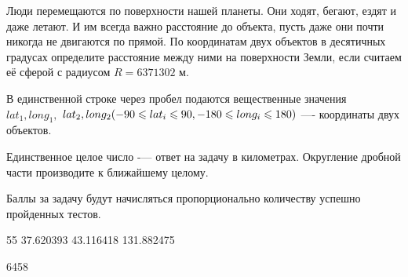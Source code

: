 
Люди перемещаются по поверхности нашей планеты. Они ходят, бегают, ездят и даже летают. И им всегда важно расстояние до объекта, пусть даже они почти никогда не двигаются по прямой. По координатам двух объектов в десятичных градусах определите расстояние между ними на поверхности Земли, если считаем её сферой с радиусом $R = 6371302$ м.


В единственной строке через пробел подаются вещественные значения $ lat_1, long_1,$ \linebreak $lat_2, long_2 \space(-90 \leq lat_i \leq 90, -180 \leq long_i \leq 180) $ —- координаты двух объектов.

\outputfmtSection

Единственное целое число -— ответ на задачу в километрах. Округление дробной части производите к ближайшему целому.

\markSection

Баллы за задачу будут начисляться пропорционально количеству успешно пройденных тестов.


\begin{myverbbox}[\small]{\vinput}
    55 37.620393 43.116418 131.882475
\end{myverbbox}

\begin{myverbbox}[\small]{\voutput}
    6458
\end{myverbbox}

